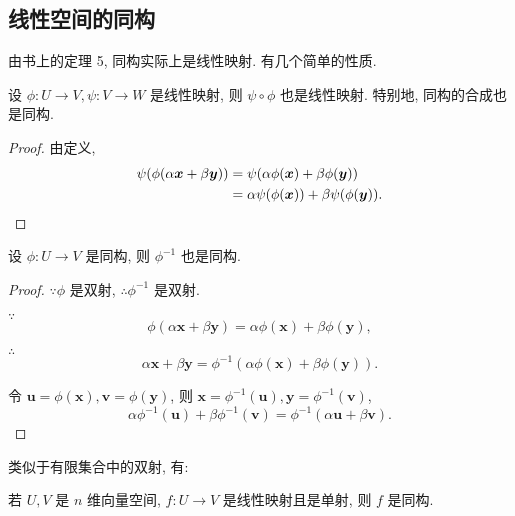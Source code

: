 \documentclass{ctexart}
\begin{document}
\subsection{线性空间的同构}
由书上的定理 5, 同构实际上是线性映射. 有几个简单的性质.
\begin{property}
    设 $\phi:U\to V,\psi:V\to W$ 是线性映射, 则 $\psi\circ\phi$ 也是线性映射. 特别地, 同构的合成也是同构.
\end{property}
\begin{proof}
    由定义,
    \begin{align*}
        \psi(\phi(\alpha\boldsymbol{x}+\beta\boldsymbol{y})) & =\psi(\alpha\phi(\boldsymbol{x})+\beta\phi(\boldsymbol{y})) \\
        & =\alpha\psi(\phi(\boldsymbol{x}))+\beta\psi(\phi(\boldsymbol{y})).\qedhere
    \end{align*}
\end{proof}
\begin{property}
    设 $\phi:U\to V$ 是同构, 则 $\phi^{-1}$ 也是同构.
\end{property}
\begin{proof}
    $\because\phi$ 是双射, $\therefore\phi^{-1}$ 是双射.

    $\because$
    \[\phi(\alpha\boldsymbol{x}+\beta\boldsymbol{y})=\alpha\phi(\boldsymbol{x})+\beta\phi(\boldsymbol{y}),\]

    $\therefore$
    \[\alpha\boldsymbol{x}+\beta\boldsymbol{y}=\phi^{-1}(\alpha\phi(\boldsymbol{x})+\beta\phi(\boldsymbol{y})).\]

    令 $\boldsymbol{u}=\phi(\boldsymbol{x}),\boldsymbol{v}=\phi(\boldsymbol{y})$, 则 $\boldsymbol{x}=\phi^{-1}(\boldsymbol{u}),\boldsymbol{y}=\phi^{-1}(\boldsymbol{v})$,
    \[\alpha\phi^{-1}(\boldsymbol{u})+\beta\phi^{-1}(\boldsymbol{v})=\phi^{-1}(\alpha\boldsymbol{u}+\beta\boldsymbol{v}).\]
\end{proof}
类似于有限集合中的双射, 有:
\begin{theorem}\label{t1.5}
    若 $U,V$ 是 $n$ 维向量空间, $f:U\to V$ 是线性映射且是单射, 则 $f$ 是同构.
\end{theorem}
\end{document}
